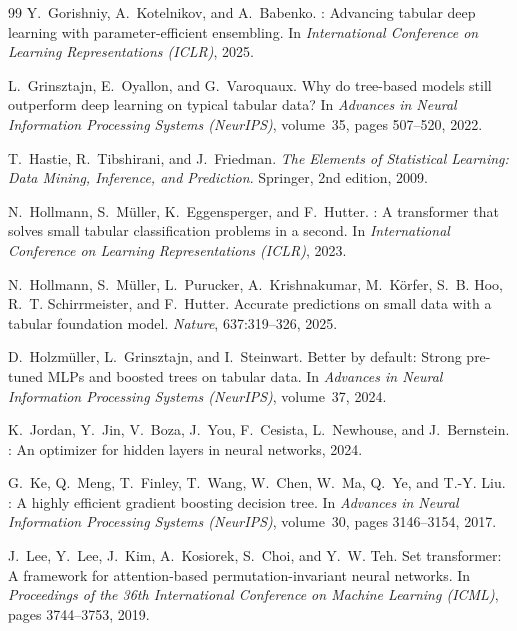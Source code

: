 \documentclass[11pt,a4paper]{article}
\begin{document}
\begin{thebibliography}{99}
Y.~Gorishniy, A.~Kotelnikov, and A.~Babenko.
: Advancing tabular deep learning with parameter-efficient ensembling.
\newblock In \emph{International Conference on Learning Representations (ICLR)}, 2025.

L.~Grinsztajn, E.~Oyallon, and G.~Varoquaux.
\newblock Why do tree-based models still outperform deep learning on typical tabular data?
\newblock In \emph{Advances in Neural Information Processing Systems (NeurIPS)}, volume~35, pages 507--520, 2022.

T.~Hastie, R.~Tibshirani, and J.~Friedman.
\newblock \emph{The Elements of Statistical Learning: Data Mining, Inference, and Prediction}.
\newblock Springer, 2nd edition, 2009.

N.~Hollmann, S.~M\"{u}ller, K.~Eggensperger, and F.~Hutter.
: A transformer that solves small tabular classification problems in a second.
\newblock In \emph{International Conference on Learning Representations (ICLR)}, 2023.

N.~Hollmann, S.~M\"{u}ller, L.~Purucker, A.~Krishnakumar, M.~K\"{o}rfer, S.~B. Hoo, R.~T. Schirrmeister, and F.~Hutter.
\newblock Accurate predictions on small data with a tabular foundation model.
\newblock \emph{Nature}, 637:319--326, 2025.

D.~Holzm\"{u}ller, L.~Grinsztajn, and I.~Steinwart.
\newblock Better by default: Strong pre-tuned {MLPs} and boosted trees on tabular data.
\newblock In \emph{Advances in Neural Information Processing Systems (NeurIPS)}, volume~37, 2024.

K.~Jordan, Y.~Jin, V.~Boza, J.~You, F.~Cesista, L.~Newhouse, and J.~Bernstein.
: An optimizer for hidden layers in neural networks, 2024.

G.~Ke, Q.~Meng, T.~Finley, T.~Wang, W.~Chen, W.~Ma, Q.~Ye, and T.-Y. Liu.
: A highly efficient gradient boosting decision tree.
\newblock In \emph{Advances in Neural Information Processing Systems (NeurIPS)}, volume~30, pages 3146--3154, 2017.

J.~Lee, Y.~Lee, J.~Kim, A.~Kosiorek, S.~Choi, and Y.~W. Teh.
\newblock Set transformer: A framework for attention-based permutation-invariant neural networks.
\newblock In \emph{Proceedings of the 36th International Conference on Machine Learning (ICML)}, pages 3744--3753, 2019.


\end{thebibliography}
\end{document}
